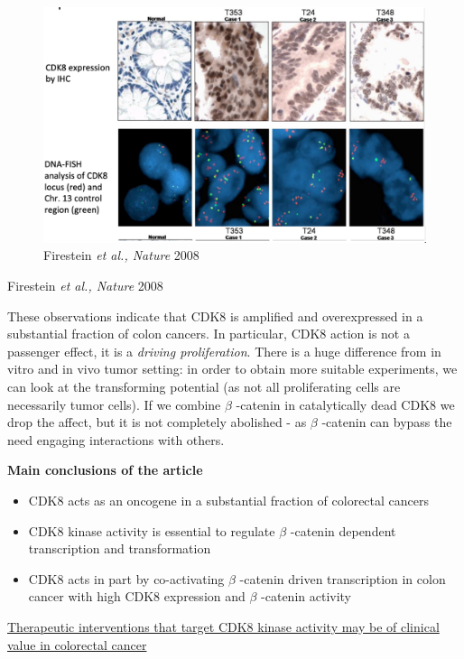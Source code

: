 \begin{figure}
\centering
\includegraphics[width=\textwidth]{../_resources/Screenshot_2022-10-10_at_12-23-14.png}
\caption{Firestein \emph{et al., Nature} 2008}
\end{figure}

Firestein \emph{et al., Nature} 2008

These observations indicate that CDK8 is amplified and overexpressed in a substantial fraction of colon cancers. In particular, CDK8 action is not a passenger effect, it is a \emph{driving proliferation}. There is a huge difference from in vitro and in vivo tumor setting: in order to obtain more suitable experiments, we can look at the transforming potential (as not all proliferating cells are necessarily tumor cells). If we combine $\beta$  -catenin in catalytically dead CDK8 we drop the affect, but it is not completely abolished - as $\beta$  -catenin can bypass the need engaging interactions with others.

\textbf{Main conclusions of the article}

\begin{itemize}
\tightlist
\item
  CDK8 acts as an oncogene in a substantial fraction of colorectal cancers
\item
  CDK8 kinase activity is essential to regulate $\beta$  -catenin dependent transcription and transformation
\item
  CDK8 acts in part by co-activating $\beta$  -catenin driven transcription in colon cancer with high CDK8 expression and $\beta$  -catenin activity
\end{itemize}

\underline{Therapeutic interventions that target CDK8 kinase activity may be of clinical value in colorectal cancer}


